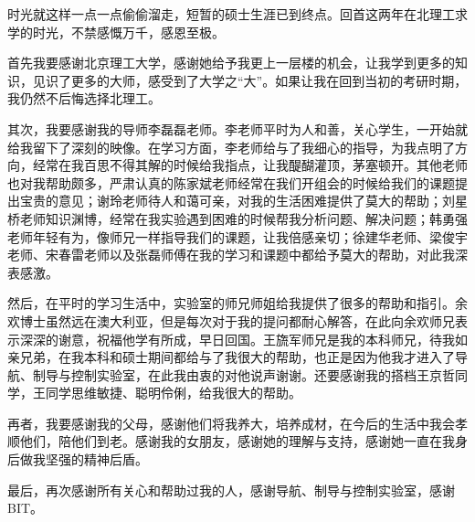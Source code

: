 
\begin{thanks}
	
时光就这样一点一点偷偷溜走，短暂的硕士生涯已到终点。回首这两年在北理工求学的时光，不禁感慨万千，感恩至极。

首先我要感谢北京理工大学，感谢她给予我更上一层楼的机会，让我学到更多的知识，见识了更多的大师，感受到了大学之“大”。如果让我在回到当初的考研时期，我仍然不后悔选择北理工。

其次，我要感谢我的导师李磊磊老师。李老师平时为人和善，关心学生，一开始就给我留下了深刻的映像。在学习方面，李老师给与了我细心的指导，为我点明了方向，经常在我百思不得其解的时候给我指点，让我醍醐灌顶，茅塞顿开。其他老师也对我帮助颇多，严肃认真的陈家斌老师经常在我们开组会的时候给我们的课题提出宝贵的意见；谢玲老师待人和蔼可亲，对我的生活困难提供了莫大的帮助；刘星桥老师知识渊博，经常在我实验遇到困难的时候帮我分析问题、解决问题；韩勇强老师年轻有为，像师兄一样指导我们的课题，让我倍感亲切；徐建华老师、梁俊宇老师、宋春雷老师以及张磊师傅在我的学习和课题中都给予莫大的帮助，对此我深表感激。

然后，在平时的学习生活中，实验室的师兄师姐给我提供了很多的帮助和指引。余欢博士虽然远在澳大利亚，但是每次对于我的提问都耐心解答，在此向余欢师兄表示深深的谢意，祝福他学有所成，早日回国。王旒军师兄是我的本科师兄，待我如亲兄弟，在我本科和硕士期间都给与了我很大的帮助，也正是因为他我才进入了导航、制导与控制实验室，在此我由衷的对他说声谢谢。还要感谢我的搭档王京哲同学，王同学思维敏捷、聪明伶俐，给我很大的帮助。

再者，我要感谢我的父母，感谢他们将我养大，培养成材，在今后的生活中我会孝顺他们，陪他们到老。感谢我的女朋友，感谢她的理解与支持，感谢她一直在我身后做我坚强的精神后盾。

最后，再次感谢所有关心和帮助过我的人，感谢导航、制导与控制实验室，感谢BIT。

\end{thanks}
